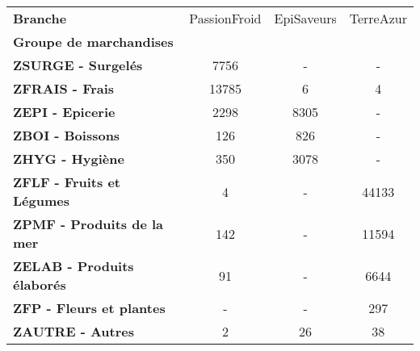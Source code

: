 \begin{tabular}{lccc}
\toprule
\textbf{Branche} & PassionFroid & EpiSaveurs & TerreAzur \\
\textbf{Groupe de marchandises   } &              &            &           \\
\midrule
\textbf{ZSURGE - Surgelés        } &         7756 &          - &         - \\
\textbf{ZFRAIS - Frais           } &        13785 &          6 &         4 \\
\textbf{ZEPI - Epicerie          } &         2298 &       8305 &         - \\
\textbf{ZBOI - Boissons          } &          126 &        826 &         - \\
\textbf{ZHYG - Hygiène           } &          350 &       3078 &         - \\
\textbf{ZFLF - Fruits et Légumes } &            4 &          - &     44133 \\
\textbf{ZPMF - Produits de la mer} &          142 &          - &     11594 \\
\textbf{ZELAB - Produits élaborés} &           91 &          - &      6644 \\
\textbf{ZFP - Fleurs et plantes  } &            - &          - &       297 \\
\textbf{ZAUTRE - Autres          } &            2 &         26 &        38 \\
\bottomrule
\end{tabular}

